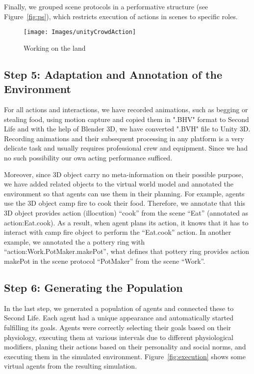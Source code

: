 Finally, we grouped scene protocols in a performative structure (see Figure~\ref{fig:ps}), which restricts execution of actions in scenes to specific roles.

\begin{figure}[!ht]
    \centering
    \texttt{[image: Images/unityCrowdAction]}
    \caption{Working on the land}
    \label{fig:praying}
\end{figure}%

\subsection{Step 5: Adaptation and Annotation of the Environment}

For all actions and interactions, we have recorded animations, such as begging or stealing food, using motion capture and copied them in ".BHV" format to Second Life and with the help of Blender 3D, we have converted ".BVH" file to Unity 3D. Recording animations and their subsequent processing in any platform is a very delicate task and usually requires professional crew and equipment. Since we had no such possibility our own acting performance sufficed. 

Moreover, since 3D object carry no meta-information on their possible purpose, we have added related objects to the virtual world model and annotated the environment so that agents can use them in their planning. For example, agents use the 3D object camp fire to cook their food. Therefore, we annotate that this 3D object provides action (illocution) ``cook'' from the scene ``Eat'' (annotated as action:Eat.cook). As a result, when agent plans its action, it knows that it has to interact with camp fire object to perform the ``Eat.cook'' action. In another example, we annotated the a pottery ring with ``action:Work.PotMaker.makePot'', what defines that pottery ring provides action makePot in the scene protocol ``PotMaker'' from the scene ``Work''.


\subsection{Step 6: Generating the Population}

In the last step, we generated a population of agents and connected these to Second Life. Each agent had a unique appearance and automatically started fulfilling its goals. Agents were correctly selecting their goals based on their physiology, executing them at various intervals due to different physiological modifiers, planing their actions based on their personality and social norms, and executing them in the simulated environment. Figure~\ref{fig:execution} shows some virtual agents from the resulting simulation. 

